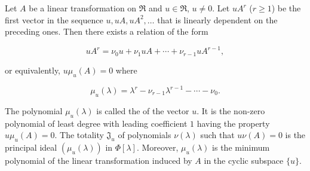 Let $A$ be a linear transformation on $\Re$ and $u \in \Re$, $u \neq 0$. Let $uA^r$ ($r \geq 1$) be the first vector in the sequence $u, uA, uA^2, \dots$ that is linearly dependent on the preceding ones. Then there exists a relation of the form

$$uA^r = \nu_0 u + \nu_1 uA + \cdots + \nu_{r-1} uA^{r-1},$$

or equivalently, $u\mu_u(A) = 0$ where

$$\mu_u(\lambda) = \lambda^r - \nu_{r-1}\lambda^{r-1} - \cdots - \nu_0.$$

The polynomial $\mu_u(\lambda)$ is called the  of the vector $u$. It is the non-zero polynomial of least degree with leading coefficient $1$ having the property $u\mu_u(A) = 0$. The totality $\mathfrak{J}_u$ of polynomials $\nu(\lambda)$ such that $u\nu(A) = 0$ is the principal ideal $(\mu_u(\lambda))$ in $\Phi[\lambda]$. Moreover, $\mu_u(\lambda)$ is the minimum polynomial of the linear transformation induced by $A$ in the cyclic subspace $\{u\}$.
